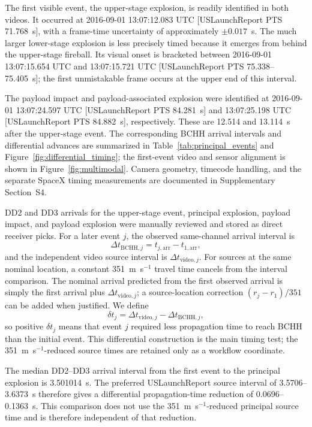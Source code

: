 \documentclass[]{seismica}
\begin{document}
The first visible event, the upper-stage explosion, is readily identified
in both videos. It occurred at 2016-09-01 13:07:12.083 UTC
[USLaunchReport PTS 71.768~s], with a frame-time uncertainty of
approximately $\pm 0.017$~s. The much larger lower-stage explosion is less
precisely timed because it emerges from behind the upper-stage fireball.
Its visual onset is bracketed between 2016-09-01 13:07:15.654 UTC and
13:07:15.721 UTC [USLaunchReport PTS 75.338--75.405~s]; the first
unmistakable frame occurs at the upper end of this interval.

The payload impact and payload-associated explosion were identified at
2016-09-01 13:07:24.597 UTC [USLaunchReport PTS 84.281~s] and
13:07:25.198 UTC [USLaunchReport PTS 84.882~s], respectively. These are
12.514 and 13.114~s after the upper-stage event. The corresponding BCHH
arrival intervals and differential advances are summarized in
Table~\ref{tab:principal_events} and Figure~\ref{fig:differential_timing};
the first-event video and sensor alignment is shown in
Figure~\ref{fig:multimodal}. Camera geometry, timecode handling, and the
separate SpaceX timing measurements are documented in Supplementary
Section~S4.

DD2 and DD3 arrivals for the upper-stage event, principal explosion, payload
impact, and payload explosion were manually reviewed and stored as direct
receiver picks. For a later event $j$, the observed same-channel arrival
interval is
\begin{equation}
 \Delta t_{\mathrm{BCHH},j}=t_{j,\mathrm{arr}}-t_{1,\mathrm{arr}},
\end{equation}
and the independent video source interval is
$\Delta t_{\mathrm{video},j}$. For sources at the same nominal location, a
constant 351~m~s$^{-1}$ travel time cancels from the interval comparison. The
nominal arrival predicted from the first observed arrival is simply the first
arrival plus $\Delta t_{\mathrm{video},j}$; a source-location correction
$(r_j-r_1)/351$ can be added when justified. We define
\begin{equation}
 \delta t_j=\Delta t_{\mathrm{video},j}-\Delta t_{\mathrm{BCHH},j},
 \label{eq:differential_advance}
\end{equation}
so positive $\delta t_j$ means that event $j$ required less propagation time
to reach BCHH than the initial event. This differential construction is the
main timing test; the 351~m~s$^{-1}$-reduced source times are retained only as
a workflow coordinate.

The median DD2--DD3 arrival interval from the first event to the principal
explosion is 3.501014~s. The preferred USLaunchReport source interval of
3.5706--3.6373~s therefore gives a differential propagation-time reduction of
0.0696--0.1363~s. This comparison does not use the
351~m~s$^{-1}$-reduced principal source time and is therefore independent of
that reduction.
\end{document}
